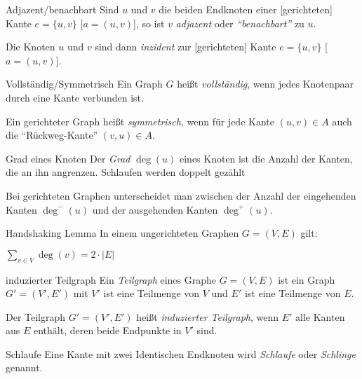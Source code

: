 \documentclass{panikzettel}
\begin{document}
\begin{thirdboxl}
	\vspace{-\baselineskip}	
	\begin{defi}{Adjazent/benachbart}
	Sind $u$ und $v$ die beiden Endknoten einer [gerichteten] Kante $e = \{u,v\}$ [$a= (u,v)$], so ist $v$ \emph{adjazent} oder \emph{``benachbart''} zu $u$.
	
	Die Knoten $u$ und $v$ sind dann \emph{inzident} zur [gerichteten] Kante $e = \{u,v\}$ [$a= (u,v)$].
	\end{defi}

	\begin{defi}{Vollständig/Symmetrisch}
		Ein Graph $G$ heißt \emph{vollständig}, wenn jedes Knotenpaar durch eine Kante verbunden ist.
		
		Ein gerichteter Graph heißt \emph{symmetrisch}, wenn für jede Kante $(u,v) \in A$ auch die ``Rückweg-Kante'' $(v,u) \in A$.
	\end{defi}
\end{thirdboxl}%
\begin{thirdboxm}
	\vspace{-\baselineskip}		
	\begin{defi}{Grad eines Knoten}
		Der \emph{Grad} $\deg (u)$ eines Knoten ist die Anzahl der Kanten, die an ihn angrenzen. Schlaufen werden doppelt gezählt
		
		Bei gerichteten Graphen unterscheidet man zwischen der Anzahl der eingehenden Kanten $\deg ^- (u)$ und der ausgehenden Kanten $\deg ^+ (u)$.
	\end{defi}

	\begin{theo}{Handshaking Lemma}
		In einem ungerichteten Graphen $G = (V,E)$ gilt:
		
		$\sum_{v \in V} \deg (v) = 2 \cdot |E|$
	\end{theo}
\end{thirdboxm}%
\begin{thirdboxr}
	\vspace{-\baselineskip}	
	\begin{defi}{induzierter Teilgraph}
		Ein \emph{Teilgraph} eines Graphe $G = (V,E)$ ist ein Graph $G' = (V',E')$ mit $V'$ ist eine Teilmenge von $V$ und $E'$ ist eine Teilmenge von $E$. 
		
		Der Teilgraph $G' = (V',E')$ heißt \emph{induzierter Teilgraph}, wenn $E'$ alle Kanten aus $E$ enthält, deren beide Endpunkte in $V'$ sind.
	\end{defi}
	
	\begin{defi}{Schlaufe}
		Eine Kante mit zwei Identischen Endknoten wird \emph{Schlaufe} oder \emph{Schlinge} genannt.
	\end{defi}
	
\end{thirdboxr}
\end{document}
